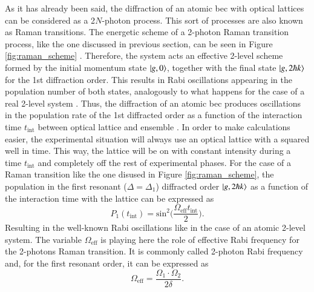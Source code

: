 As it has already been said, the diffraction of an atomic \ac{bec} with optical lattices can be considered as a 2$N$-photon process. This sort of processes are also known as Raman transitions. The energetic scheme of a 2-photon Raman transition process, like the one discussed in previous section, can be seen in Figure \ref{fig:raman_scheme} \cite{Kozuma1999}. Therefore, the system acts an effective 2-level scheme formed by the initial momentum state $\ket{g, 0}$, together with the final state $\ket{g, 2\hbar k}$ for the 1st diffraction order. This results in Rabi oscillations appearing in the population number of both states, analogously to what happens for the case of a real 2-level system \cite{Foot2005}. Thus, the diffraction of an atomic \ac{bec} produces oscillations in the population rate of the 1st diffracted order as a function of the interaction time $t_\text{int}$ between optical lattice and ensemble \cite{Martin1988}. In order to make calculations easier, the experimental situation will always use an optical lattice with a squared well in time. This way, the lattice will be on with constant intensity during a time $t_{\text{int}}$ and completely off the rest of experimental phases. For the case of a Raman transition like the one disused in Figure \ref{fig:raman_scheme}, the population in the first resonant ($\Delta=\Delta_1$) diffracted order $\ket{g, 2\hbar k}$ as a function of the interaction time with the lattice can be expressed as
\begin{equation}\label{eq:population_excited_state}
	P_1(t_\text{int}) = \text{sin}^2\bigg(\frac{\Omega_\text{eff} t_\text{int}}{2}\bigg).
\end{equation}
Resulting in the well-known Rabi oscillations like in the case of an atomic 2-level system. The variable $\Omega_\text{eff}$ is playing here the role of effective Rabi frequency for the 2-photons Raman transition. It is commonly called 2-photon Rabi frequency and, for the first resonant order, it can be expressed as
\begin{equation}\label{eq:effective_Rabi_frequency}
	\Omega_\text{eff} = \frac{\Omega_1 \cdot \Omega_2}{2\delta}.
\end{equation}
